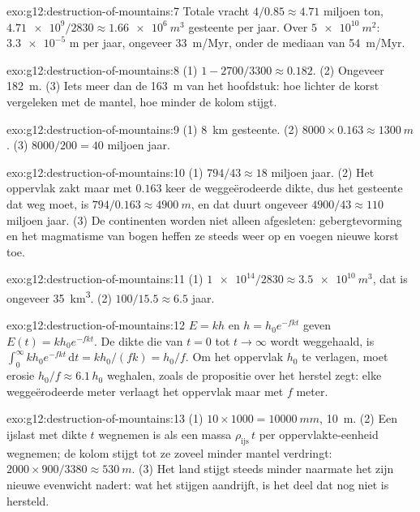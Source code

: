 \begin{solution}{exo:g12:destruction-of-mountains:7}
Totale vracht $4/0.85 \approx 4.71$ miljoen ton, $\num{4.71e9}/2830 \approx
\qty{1.66e6}{m^3}$ gesteente per jaar. Over $\qty{5e10}{m^2}$: $\num{3.3e-5}$ m per
jaar, ongeveer \qty{33}{m/Myr}, onder de mediaan van \qty{54}{m/Myr}.
\end{solution}

\begin{solution}{exo:g12:destruction-of-mountains:8}
(1) $1 - 2700/3300 \approx 0.182$. (2) Ongeveer \qty{182}{m}. (3) Iets meer
dan de \qty{163}{m} van het hoofdstuk: hoe lichter de korst vergeleken met de
mantel, hoe minder de kolom stijgt.
\end{solution}

\begin{solution}{exo:g12:destruction-of-mountains:9}
(1) \qty{8}{km} gesteente. (2) $8000 \times 0.163 \approx \qty{1300}{m}$.
(3) $8000/200 = 40$ miljoen jaar.
\end{solution}

\begin{solution}{exo:g12:destruction-of-mountains:10}
(1) $794/43 \approx 18$ miljoen jaar. (2) Het oppervlak zakt maar met
$0.163$ keer de weggeërodeerde dikte, dus het gesteente dat weg moet, is $794/0.163
\approx \qty{4900}{m}$, en dat duurt ongeveer $4900/43 \approx 110$ miljoen jaar.
(3) De continenten worden niet alleen afgesleten: gebergtevorming en het
magmatisme van bogen heffen ze steeds weer op en voegen nieuwe korst toe.
\end{solution}

\begin{solution}{exo:g12:destruction-of-mountains:11}
(1) $\num{1e14}/2830 \approx \qty{3.5e10}{m^3}$, dat is ongeveer
\qty{35}{km^3}. (2) $100/15.5 \approx 6.5$ jaar.
\end{solution}

\begin{solution}{exo:g12:destruction-of-mountains:12}
$E = kh$ en $h = h_0 e^{-fkt}$ geven $E(t) = kh_0 e^{-fkt}$. De dikte die
van $t = 0$ tot $t \to \infty$ wordt weggehaald, is $\int_0^{\infty} kh_0
e^{-fkt}\,\mathrm{d}t = kh_0/(fk) = h_0/f$. Om het oppervlak $h_0$ te verlagen,
moet erosie $h_0/f \approx 6.1\,h_0$ weghalen, zoals de propositie over het herstel
zegt: elke weggeërodeerde meter verlaagt het oppervlak maar met $f$ meter.
\end{solution}

\begin{solution}{exo:g12:destruction-of-mountains:13}
(1) $10 \times 1000 = \qty{10000}{mm}$, \qty{10}{m}. (2) Een ijslast met
dikte $t$ wegnemen is als een massa $\rho_{\text{ijs}}\,t$ per oppervlakte-eenheid
wegnemen; de kolom stijgt tot ze zoveel minder mantel verdringt:
$2000 \times 900/3380 \approx \qty{530}{m}$. (3) Het land stijgt steeds minder
naarmate het zijn nieuwe evenwicht nadert: wat het stijgen aandrijft, is het deel dat
nog niet is hersteld.
\end{solution}

